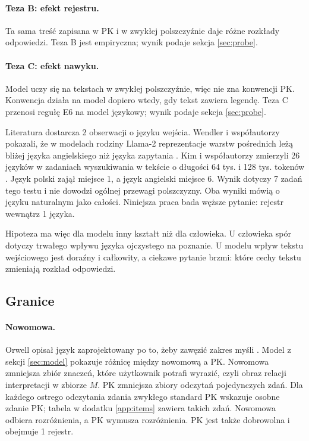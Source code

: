 \paragraph{Teza B: efekt rejestru.}
Ta sama treść zapisana w PK i w zwykłej polszczyźnie daje różne rozkłady odpowiedzi.
Teza B jest empiryczna; wynik podaje sekcja \ref{sec:probe}.

\paragraph{Teza C: efekt nawyku.}
Model uczy się na tekstach w zwykłej polszczyźnie, więc nie zna konwencji PK. Konwencja
działa na model dopiero wtedy, gdy tekst zawiera legendę. Teza C przenosi regułę E6 na
model językowy; wynik podaje sekcja \ref{sec:probe}.

Literatura dostarcza 2 obserwacji o języku wejścia. Wendler i współautorzy pokazali, że
w modelach rodziny Llama-2 reprezentacje warstw pośrednich leżą bliżej języka angielskiego
niż języka zapytania \cite{wendler2024}. Kim i współautorzy zmierzyli 26 języków w zadaniach
wyszukiwania w tekście o długości 64 tys. i 128 tys. tokenów \cite{kim2025}. Język polski
zajął miejsce 1, a język angielski miejsce 6. Wynik dotyczy 7 zadań tego testu
i nie dowodzi ogólnej przewagi polszczyzny. Oba wyniki mówią o języku naturalnym jako
całości. Niniejsza praca bada węższe pytanie: rejestr wewnątrz 1 języka.

Hipoteza ma więc dla modelu inny kształt niż dla człowieka. U człowieka spór dotyczy
trwałego wpływu języka ojczystego na poznanie. U modelu wpływ tekstu wejściowego jest
doraźny i całkowity, a ciekawe pytanie brzmi: które cechy tekstu zmieniają rozkład
odpowiedzi.

\subsection{Granice}
\label{sec:limits}

\paragraph{Nowomowa.}
Orwell opisał język zaprojektowany po to, żeby zawęzić zakres myśli
\cite{orwell1949}. Model z sekcji \ref{sec:model} pokazuje różnicę między nowomową a PK.
Nowomowa zmniejsza zbiór znaczeń, które użytkownik potrafi wyrazić, czyli obraz relacji
interpretacji w zbiorze $M$. PK zmniejsza zbiory odczytań pojedynczych zdań. Dla każdego
ostrego odczytania zdania zwykłego standard PK wskazuje osobne zdanie PK; tabela
w dodatku \ref{app:items} zawiera \pkItemsPkSentences{} takich zdań. Nowomowa odbiera
rozróżnienia, a PK wymusza rozróżnienia. PK jest także dobrowolna i obejmuje 1 rejestr.

